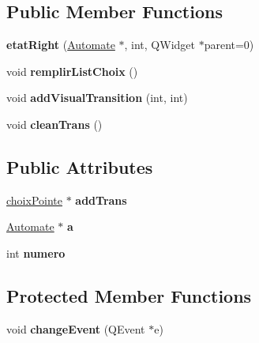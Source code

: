 \subsection*{Public Member Functions}
\begin{DoxyCompactItemize}
\item 
\hypertarget{classetat_right_a174e152a40be3b9194125bc141b8cca6}{{\bfseries etat\-Right} (\hyperlink{class_automate}{Automate} $\ast$, int, Q\-Widget $\ast$parent=0)}\label{classetat_right_a174e152a40be3b9194125bc141b8cca6}

\item 
\hypertarget{classetat_right_a6631d8b4878cdaa7c8443c24825fd791}{void {\bfseries remplir\-List\-Choix} ()}\label{classetat_right_a6631d8b4878cdaa7c8443c24825fd791}

\item 
\hypertarget{classetat_right_a9bd49810066fc43059d2adf138784fd6}{void {\bfseries add\-Visual\-Transition} (int, int)}\label{classetat_right_a9bd49810066fc43059d2adf138784fd6}

\item 
\hypertarget{classetat_right_a181683fbe813964220ddde7a048d840c}{void {\bfseries clean\-Trans} ()}\label{classetat_right_a181683fbe813964220ddde7a048d840c}

\end{DoxyCompactItemize}
\subsection*{Public Attributes}
\begin{DoxyCompactItemize}
\item 
\hypertarget{classetat_right_a1a3bbd118e907a6b9fe76ac22c702006}{\hyperlink{classchoix_pointe}{choix\-Pointe} $\ast$ {\bfseries add\-Trans}}\label{classetat_right_a1a3bbd118e907a6b9fe76ac22c702006}

\item 
\hypertarget{classetat_right_aa6d344e0bd745915bfb4ea0e767f0bc0}{\hyperlink{class_automate}{Automate} $\ast$ {\bfseries a}}\label{classetat_right_aa6d344e0bd745915bfb4ea0e767f0bc0}

\item 
\hypertarget{classetat_right_ab061da0425585fa691f3766e3e81708c}{int {\bfseries numero}}\label{classetat_right_ab061da0425585fa691f3766e3e81708c}

\end{DoxyCompactItemize}
\subsection*{Protected Member Functions}
\begin{DoxyCompactItemize}
\item 
\hypertarget{classetat_right_a0ca046ca45f51033a57401d90346dbec}{void {\bfseries change\-Event} (Q\-Event $\ast$e)}\label{classetat_right_a0ca046ca45f51033a57401d90346dbec}

\end{DoxyCompactItemize}



